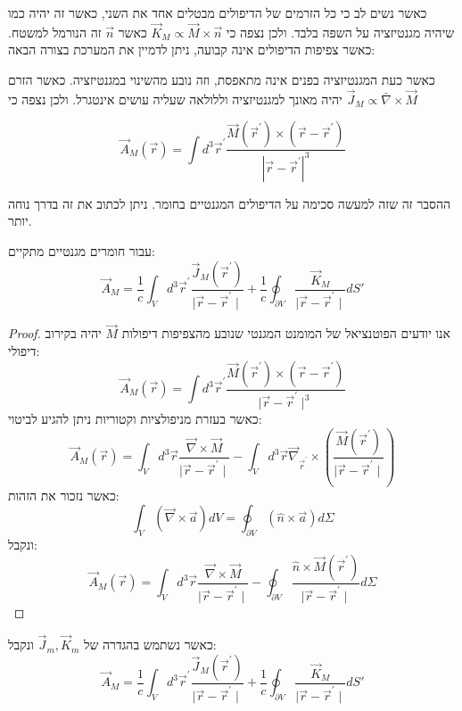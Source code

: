\documentclass{tstextbook}
\begin{document}
כאשר נשים לב כי כל הזרמים של הדיפולים מבטלים אחד את השני, כאשר זה יהיה כמו שיהיה מגנטיזציה על השפה בלבד. ולכן נצפה כי \(\vec{K}_{M}\propto \vec{M} \times \vec{n}\) כאשר \(\vec{n}\) זה הנורמל למשטח. כאשר צפיפות הדיפולים אינה קבועה, ניתן לדמיין את המערכת בצורה הבאה:

כאשר כעת המגנטיזציה בפנים אינה מתאפסת, וזה נובע מהשינוי במגנטיזציה. כאשר הזרם יהיה מאונך למגנטיזציה וללולאה שעליה עושים אינטגרל. ולכן נצפה כי \(\vec{J}_{M}\propto \bar{\nabla} \times \vec{M}\)

\begin{proposition}
$$\vec{A}_{M}\left(\vec{r}\right)=\int d^{3}\vec{r}^{\prime}\frac{\vec{M}\left(\vec{r}^{\prime}\right)\times\left(\vec{r}-\vec{r}^{\prime}\right)}{|\vec{r}-\vec{r}^{\prime}|^{3}}$$

\end{proposition}
ההסבר זה שזה למעשה סכימה על הדיפולים המגנטיים בחומר. ניתן לכתוב את זה בדרך נוחה יותר.

\begin{proposition}
עבור חומרים מגנטיים מתקיים:
$$\vec{A}_{M}=\frac{1}{c}\int_{V}d^{3}\vec{r}^{\prime}\frac{\vec{J}_{M}\left(\vec{r}^{\prime}\right)}{\mid\vec{r}-\vec{r}^{\prime}\mid}+\frac{1}{c}\oint_{\partial V}\frac{\vec{K}_{M}}{\mid\vec{r}-\vec{r}^{\prime}\mid}dS'$$

\end{proposition}
\begin{proof}
אנו יודעים הפוטנציאל של המומנט המגנטי שנובע מהצפיפות דיפולות \(\vec{M}\) יהיה בקירוב דיפולי: 
$$\vec{A}_{M}\left(\vec{r}\right)=\int d^{3}\vec{r}^{\prime}\frac{\vec{M}\left(\vec{r}^{\prime}\right)\times\left(\vec{r}-\vec{r}^{\prime}\right)}{\mid\vec{r}-\vec{r}^{\prime}\mid^{3}}$$
כאשר בעזרת מניפולציות וקטוריות ניתן להגיע לביטוי:
$$\vec{A}_{M}\left(\vec{r}\right)=\int_{V}d^{3}\vec{r}\frac{\vec{\nabla}\times\vec{M}}{\mid\vec{r}-\vec{r}^{\prime}\mid}-\int_{V}d^{3}\vec{r}\vec{\nabla}_{\vec{r}^{\prime}}\times\left(\frac{\vec{M}\left(\vec{r}^{\prime}\right)}{\mid\vec{r}-\vec{r}^{\prime}\mid}\right)$$
כאשר נזכור את הזהות:
$$\int_{V}\left({\vec{\nabla}}\times{\vec{a}}\right)d V=\oint_{\partial V}\left({\hat{n}}\times{\vec{a}}\right)d\Sigma$$
ונקבל:
$$\vec{A}_{M}\left(\vec{r}\right)=\int_{V}d^{3}\vec{r}\frac{\vec{\nabla}\times\vec{M}}{\mid\vec{r}-\vec{r}^{\prime}\mid}-\oint_{\partial V}\frac{\hat{n}\times\vec{M}\left(\vec{r}^{\prime}\right)}{\mid\vec{r}-\vec{r}^{\prime}\mid}d\Sigma$$

\end{proof}
כאשר נשתמש בהגדרה של \(\vec{J}_{m},\vec{K}_{m}\) ונקבל:
$$\vec{A}_{M}=\frac{1}{c}\int_{V}d^{3}\vec{r}^{\prime}\frac{\vec{J}_{M}\left(\vec{r}^{\prime}\right)}{\mid\vec{r}-\vec{r}^{\prime}\mid}+\frac{1}{c}\oint_{\partial V}\frac{\vec{K}_{M}}{\mid\vec{r}-\vec{r}^{\prime}\mid}dS'$$
\end{document}

